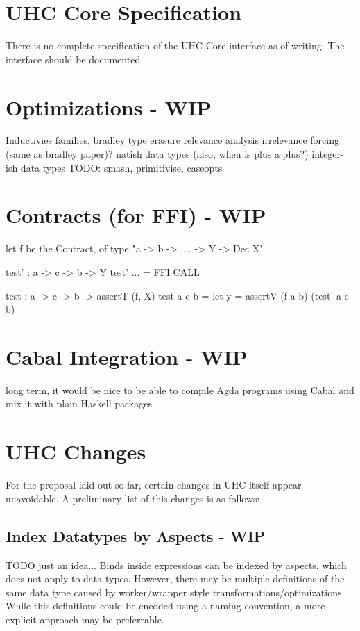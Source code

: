 \documentclass[12pt, a4paper, twoside]{report}
\begin{document}
\section{UHC Core Specification}
There is no complete specification of the UHC Core interface as of writing. The interface
should be documented.

\section{Optimizations - WIP}
Inductivies families, bradley
type erasure
relevance analysis
irrelevance
forcing (same as bradley paper)?
natish data types (also, when is plus a plus?)
integer-ish data types
TODO: smash, primitivise, caseopts

\section{Contracts (for FFI) - WIP}

let f be the Contract, of type "a -> b -> .... -> Y -> Dec X"

test' : a -> c -> b -> Y
test' ... = FFI CALL

test : a -> c -> b -> assertT (f, X)
test a c b = let y = assertV (f a b) (test' a c b)


\section{Cabal Integration - WIP}
long term, it would be nice to be able to compile Agda programs using Cabal and
mix it with plain Haskell packages.

\section{UHC Changes}
For the proposal laid out so far, certain changes in UHC itself appear
unavoidable. A preliminary list of this changes is as follows:

\subsection{Index Datatypes by Aspects - WIP}
TODO just an idea...
Binds inside expressions can be indexed by aspects, which does
not apply to data types. However, there may be multiple definitions
of the same data type caused by worker/wrapper style transformations/optimizations.
While this definitions could be encoded using a naming convention, a more explicit
approach may be preferrable.
\end{document}
